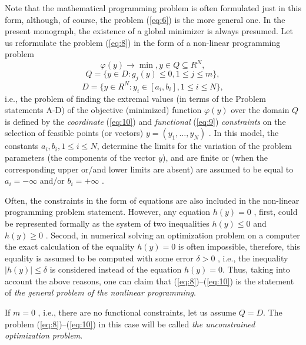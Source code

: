 Note that the mathematical programming problem is often formulated just in this form, although, of course, the problem (\ref{eq:6}) is the more general one.
In the present monograph, the existence of a global minimizer is always presumed. Let us reformulate the problem (\ref{eq:8}) in the form of a non-linear programming problem
\begin{equation}
\label{eq:8}
\varphi(y)\rightarrow\min, y \in Q\subseteq R^N,
\end{equation}
\begin{equation}
\label{eq:9}
Q=\{y \in D:g_j(y)\leq 0,1\leq j\leq m \},
\end{equation}
\begin{equation}
\label{eq:10}
D=\{y \in R^N:y_i\in [a_i,b_i],1\leq i\leq N \},
\end{equation}
i.e., the problem of finding the extremal values (in terms of the Problem statements A-D) of the objective (minimized) function $\varphi(y)$  over the domain $Q$ is defined by the \textit{coordinate} (\ref{eq:10}) and \textit{functional} (\ref{eq:9}) \textit{constraints} on the selection of feasible points (or vectors) $y=(y_1,\ldots ,y_N)$ . In this model, the constants $a_i,b_i, 1\leq i\leq N$,  determine the limits for the variation of the problem parameters (the components of the vector $y$), and are finite or (when the corresponding upper or/and lower limits are absent) are assumed to be equal to $a_i=-\infty $  and/or $b_i=+\infty $ .

Often, the constraints in the form of equations are also included in the non-linear programming problem statement. However, any equation $h(y)=0$ , first, could be represented formally as the system of two inequalities $h(y)\leq 0$  and $h(y)\geq 0$ . Second, in numerical solving an optimization problem on a computer the exact calculation of the equality $h(y)=0$ is often impossible, therefore, this equality is assumed to be computed  with some error $\delta>0$ , i.e., the inequality $\left|h(y)\right|\leq \delta$ is considered instead of the equation $h(y)=0$. Thus, taking into account the above reasons, one can claim that (\ref{eq:8})--(\ref{eq:10}) is the statement of  \textit {the general  problem of the nonlinear programming}.

If $m=0$ , i.e., there are no functional constraints, let us assume $Q=D$. The problem (\ref{eq:8})--(\ref{eq:10}) in this case will be called \textit {the unconstrained optimization problem}.

